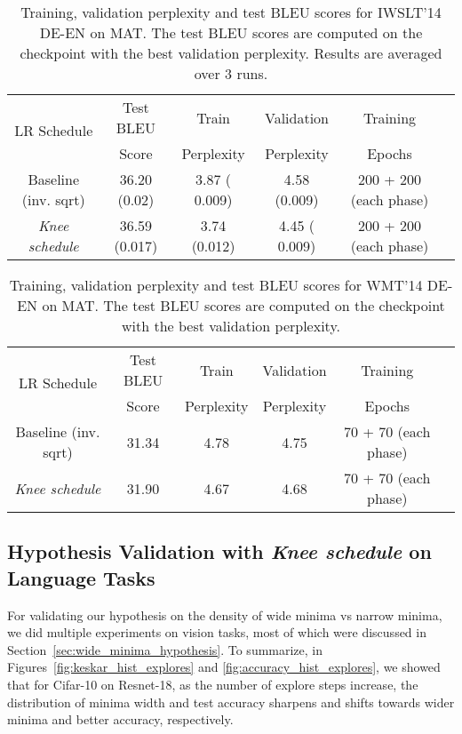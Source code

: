 \documentclass[twoside,11pt]{article}
\newcommand{\lrschedule}{\textit{Knee schedule}}
\begin{document}
\begin{table}[h]
\small
\centering
\caption{Training, validation perplexity and test BLEU scores for IWSLT'14 DE-EN on MAT. The test BLEU scores are computed on the checkpoint with the best validation perplexity. Results are averaged over 3 runs.}
\label{tab:iwslt_mat_results_train_loss_test_acc}
{\setlength{\extrarowheight}{1pt}\begin{tabular}{cccccc}
\toprule
  \multirow{2}{*}{LR Schedule} & Test BLEU  & Train & Validation  & Training \\
  &  Score & Perplexity  & Perplexity & Epochs \\ 
 \midrule
Baseline (inv. sqrt)  &  36.20 (0.02)   & 3.87 ( 0.009)  & 4.58 (0.009)  & 200 + 200 (each phase) \\
\lrschedule{}  & 36.59 (0.017)  & 3.74 (0.012)  & 4.45 ( 0.009)  & 200 + 200 (each phase) \\ 
\bottomrule 
\end{tabular}}

\end{table}

\begin{table}[h]
\small
\centering
\caption{Training, validation perplexity and test BLEU scores for WMT'14 DE-EN on MAT. The test BLEU scores are computed on the checkpoint with the best validation perplexity.}
\label{tab:wmt_mat_results_train_loss_test_acc}
{\setlength{\extrarowheight}{1pt}\begin{tabular}{cccccc}
\toprule
  \multirow{2}{*}{LR Schedule} & Test BLEU  & Train & Validation  & Training \\
  &  Score & Perplexity  & Perplexity & Epochs \\ 
 \midrule
Baseline (inv. sqrt)  &  31.34  & 4.78  & 4.75  & 70 + 70 (each phase) \\
\lrschedule{}         & 31.90  & 4.67  & 4.68   & 70 + 70 (each phase) \\ 
\bottomrule 
\end{tabular}}

\end{table}
\fi

 \subsection{Hypothesis Validation with \lrschedule{} on Language Tasks}
\label{sec:hypothesis_validation}

For validating our hypothesis on the density of wide minima vs narrow minima, we did multiple experiments on vision tasks, most of which were discussed in Section~\ref{sec:wide_minima_hypothesis}.
To summarize, in Figures~\ref{fig:keskar_hist_explores} and \ref{fig:accuracy_hist_explores}, we showed that for Cifar-10 on Resnet-18, as the number of explore steps increase, the distribution of minima width and test accuracy sharpens and shifts towards wider minima and better accuracy, respectively. 
\end{document}
